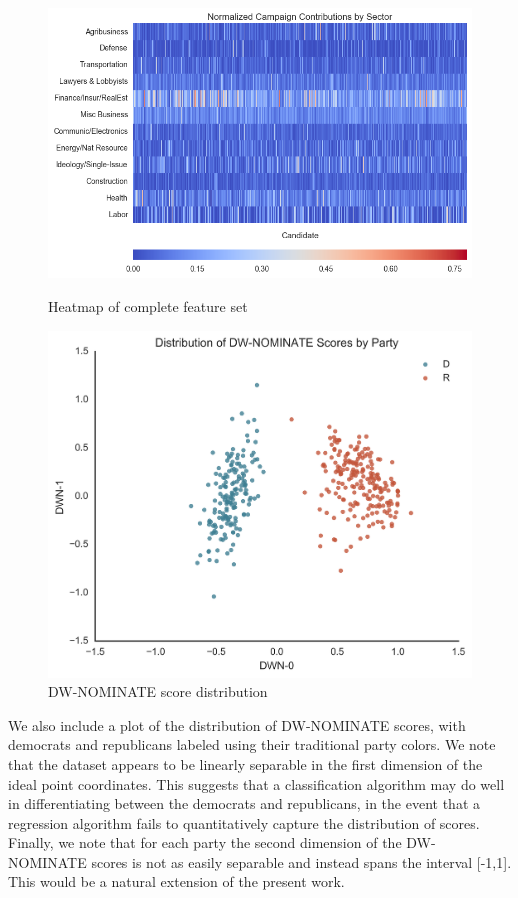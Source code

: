 \documentclass[12]{article}
\begin{document}
\begin{figure}[H]
  \centering
  \begin{minipage}[b]{0.5\textwidth}
    \includegraphics[width=\textwidth]{cand_2010_2012_2014_fm_trim_normed_feature_hm.png}
    \caption{\label{fig:feature_heatmap}Heatmap of complete feature set}
  \end{minipage}
  \hfill
  \begin{minipage}[b]{0.4\textwidth}
    \includegraphics[width=\textwidth]{dwn.png}
    \caption{\label{fig:dwn}DW-NOMINATE score distribution}
  \end{minipage}
\end{figure}

\noindent We also include a plot of the distribution of DW-NOMINATE scores, with democrats and republicans labeled using their traditional party colors. We note that the dataset appears to be linearly separable in the first dimension of the ideal point coordinates. This suggests that a classification algorithm may do well in differentiating between the democrats and republicans, in the event that a regression algorithm fails to quantitatively capture the distribution of scores. Finally, we note that for each party the second dimension of the DW-NOMINATE scores is not as easily separable and instead spans the interval [-1,1]. This would be a natural extension of the present work.
\end{document}

